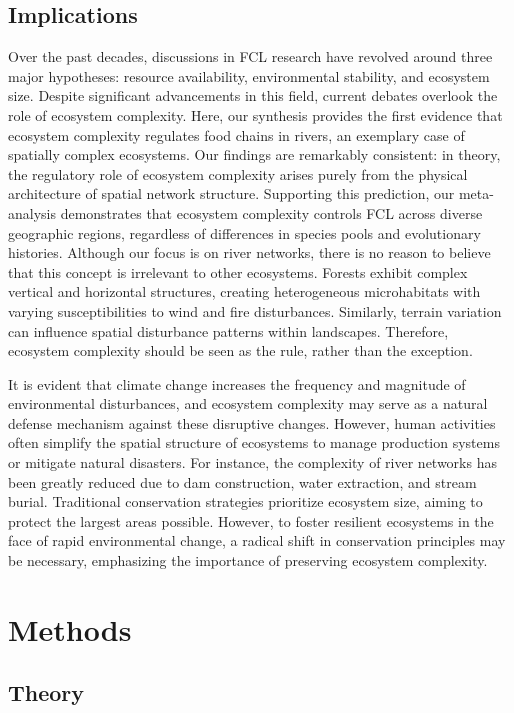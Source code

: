 \documentclass[11pt, class=article, crop=false]{standalone}
\begin{document}
\subsection{Implications}
Over the past decades, discussions in FCL research have revolved around three major hypotheses: resource availability, environmental stability, and ecosystem size.
Despite significant advancements in this field, current debates overlook the role of ecosystem complexity.
Here, our synthesis provides the first evidence that ecosystem complexity regulates food chains in rivers, an exemplary case of spatially complex ecosystems.
Our findings are remarkably consistent: in theory, the regulatory role of ecosystem complexity arises purely from the physical architecture of spatial network structure.
Supporting this prediction, our meta-analysis demonstrates that ecosystem complexity controls FCL across diverse geographic regions, regardless of differences in species pools and evolutionary histories.
Although our focus is on river networks, there is no reason to believe that this concept is irrelevant to other ecosystems.
Forests exhibit complex vertical and horizontal structures, creating heterogeneous microhabitats with varying susceptibilities to wind and fire disturbances.
Similarly, terrain variation can influence spatial disturbance patterns within landscapes. Therefore, ecosystem complexity should be seen as the rule, rather than the exception.

It is evident that climate change increases the frequency and magnitude of environmental disturbances, and ecosystem complexity may serve as a natural defense mechanism against these disruptive changes.
However, human activities often simplify the spatial structure of ecosystems to manage production systems or mitigate natural disasters.
For instance, the complexity of river networks has been greatly reduced due to dam construction, water extraction, and stream burial.
Traditional conservation strategies prioritize ecosystem size, aiming to protect the largest areas possible.
However, to foster resilient ecosystems in the face of rapid environmental change, a radical shift in conservation principles may be necessary, emphasizing the importance of preserving ecosystem complexity.

\section{Methods}

\subsection{Theory}
\end{document}
